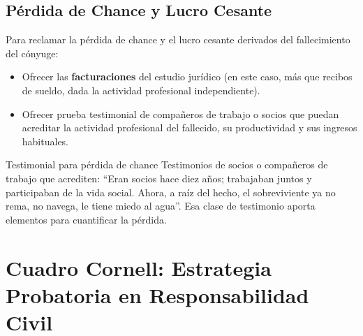 \documentclass[12pt,oneside]{book}
\begin{document}
\subsection{Pérdida de Chance y Lucro Cesante}

Para reclamar la pérdida de chance y el lucro cesante derivados del fallecimiento del cónyuge:
\begin{itemize}
    \item Ofrecer las \textbf{facturaciones} del estudio jurídico (en este caso, más que recibos de sueldo, dada la actividad profesional independiente).
    \item Ofrecer prueba testimonial de compañeros de trabajo o socios que puedan acreditar la actividad profesional del fallecido, su productividad y sus ingresos habituales.
\end{itemize}

\begin{example}{Testimonial para pérdida de chance}
Testimonios de socios o compañeros de trabajo que acrediten: ``Eran socios hace diez años; trabajaban juntos y participaban de la vida social. Ahora, a raíz del hecho, el sobreviviente ya no rema, no navega, le tiene miedo al agua''. Esa clase de testimonio aporta elementos para cuantificar la pérdida.
\end{example}

\section*{Cuadro Cornell: Estrategia Probatoria en Responsabilidad Civil}
\end{document}
